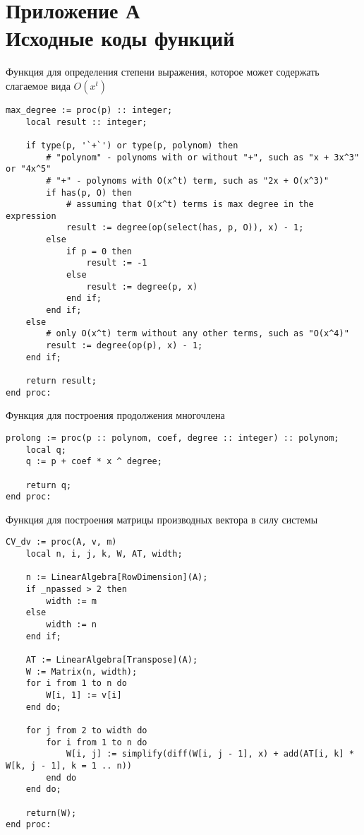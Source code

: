 \section{Приложение А \\ Исходные коды функций}


Функция для определения степени выражения, которое может содержать слагаемое вида $O(x^t)$
\begin{lstlisting}[basicstyle=\scriptsize]
max_degree := proc(p) :: integer;
    local result :: integer;
    
    if type(p, '`+`') or type(p, polynom) then
        # "polynom" - polynoms with or without "+", such as "x + 3x^3" or "4x^5"
        # "+" - polynoms with O(x^t) term, such as "2x + O(x^3)"
        if has(p, O) then
            # assuming that O(x^t) terms is max degree in the expression
            result := degree(op(select(has, p, O)), x) - 1;
        else
            if p = 0 then
                result := -1
            else
                result := degree(p, x)
            end if;
        end if;
    else
        # only O(x^t) term without any other terms, such as "O(x^4)"
        result := degree(op(p), x) - 1;
    end if;
    
    return result;
end proc:
\end{lstlisting}


\bigskip
Функция для построения продолжения многочлена
\begin{lstlisting}[basicstyle=\scriptsize]
prolong := proc(p :: polynom, coef, degree :: integer) :: polynom;
    local q;
    q := p + coef * x ^ degree;
    
    return q;
end proc:
\end{lstlisting}


\newpage
Функция для построения матрицы производных вектора в силу системы
\begin{lstlisting}[basicstyle=\scriptsize]
CV_dv := proc(A, v, m)
    local n, i, j, k, W, AT, width;
    
    n := LinearAlgebra[RowDimension](A);
    if _npassed > 2 then
        width := m
    else
        width := n
    end if;
    
    AT := LinearAlgebra[Transpose](A);
    W := Matrix(n, width);
    for i from 1 to n do
        W[i, 1] := v[i]
    end do;
    
    for j from 2 to width do
        for i from 1 to n do
            W[i, j] := simplify(diff(W[i, j - 1], x) + add(AT[i, k] * W[k, j - 1], k = 1 .. n))
        end do
    end do;
    
    return(W);
end proc:
\end{lstlisting}


